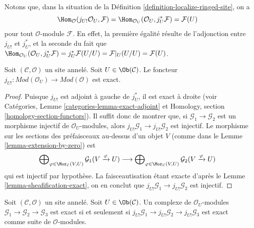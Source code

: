 \noindent
Notons que, dans la situation de la
Définition \ref{definition-localize-ringed-site}, on a
\begin{equation}
\label{equation-map-lower-shriek-OU-into-module}
\Hom_\mathcal{O}(j_{U!}\mathcal{O}_U, \mathcal{F}) =
\Hom_{\mathcal{O}_U}(\mathcal{O}_U, j_U^*\mathcal{F}) =
\mathcal{F}(U)
\end{equation}
pour tout $\mathcal{O}$-module $\mathcal{F}$. En effet, la première égalité
résulte de l'adjonction entre $j_{U!}$ et $j_U^*$, et la seconde du fait que
$\Hom_{\mathcal{O}_U}(\mathcal{O}_U, j_U^*\mathcal{F}) =
j_U^*\mathcal{F}(U/U) = \mathcal{F}|_U(U/U) = \mathcal{F}(U)$.

\begin{lemma}
\label{lemma-extension-by-zero-exact}
Soit $(\mathcal{C}, \mathcal{O})$ un site annelé.
Soit $U \in \Ob(\mathcal{C})$.
Le foncteur
$j_{U!} : \textit{Mod}(\mathcal{O}_U) \to \textit{Mod}(\mathcal{O})$
est exact.
\end{lemma}

\begin{proof}
Puisque $j_{U!}$ est adjoint à gauche de $j_U^*$, il est exact à droite
(voir
Catégories, Lemme \ref{categories-lemma-exact-adjoint}
et
Homology, section \ref{homology-section-functors}).
Il suffit donc de montrer que, si $\mathcal{G}_1 \to \mathcal{G}_2$
est un morphisme injectif de $\mathcal{O}_U$-modules, alors
$j_{U!}\mathcal{G}_1 \to j_{U!}\mathcal{G}_2$ est injectif.
Le morphisme sur les sections des préfaisceaux au-dessus d'un objet $V$
(comme dans le Lemme \ref{lemma-extension-by-zero}) est
$$
\bigoplus\nolimits_{\varphi \in \Mor_\mathcal{C}(V, U)}
\mathcal{G}_1(V \xrightarrow{\varphi} U)
\longrightarrow
\bigoplus\nolimits_{\varphi \in \Mor_\mathcal{C}(V, U)}
\mathcal{G}_2(V \xrightarrow{\varphi} U)
$$
qui est injectif par hypothèse. La faisceautisation étant exacte d'après le
Lemme \ref{lemma-sheafification-exact},
on en conclut que $j_{U!}\mathcal{G}_1 \to j_{U!}\mathcal{G}_2$ est injectif.
\end{proof}

\begin{lemma}
\label{lemma-j-shriek-reflects-exactness}
Soit $(\mathcal{C}, \mathcal{O})$ un site annelé.
Soit $U \in \Ob(\mathcal{C})$. Un complexe de $\mathcal{O}_U$-modules
$\mathcal{G}_1 \to \mathcal{G}_2 \to \mathcal{G}_3$ est exact
si et seulement si
$j_{U!}\mathcal{G}_1 \to j_{U!}\mathcal{G}_2 \to j_{U!}\mathcal{G}_3$
est exact comme suite de $\mathcal{O}$-modules.
\end{lemma}

